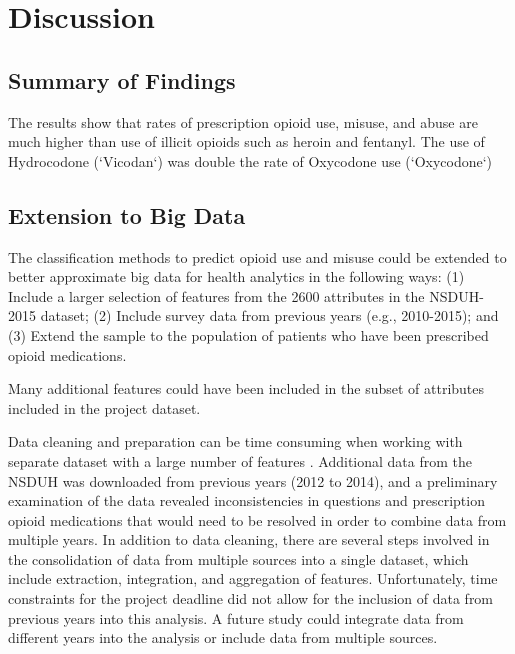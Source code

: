 \documentclass[sigconf]{acmart}
\begin{document}
\section{Discussion}

\subsection{Summary of Findings}

The results show that rates of prescription opioid use, misuse, and abuse are
much higher than use of illicit opioids such as heroin and fentanyl. The use of
Hydrocodone (`Vicodan`) was double the rate of Oxycodone use (`Oxycodone`)




\subsection{Extension to Big Data}

The classification methods to predict opioid use and misuse could be extended 
to better approximate big data for health analytics in the following ways: (1) 
Include a larger selection of features from the 2600 attributes in the NSDUH-
2015 dataset; (2) Include survey data from previous years (e.g., 2010-2015); 
and (3) Extend the sample to the population of patients who have been 
prescribed opioid medications. 

Many additional features could have been included in the subset of attributes 
included in the project dataset. 

Data cleaning and preparation can be time consuming when working
with separate dataset with a large number of features \cite{rahm00}. 
Additional data from the NSDUH was downloaded from previous years (2012 to 
2014), and a preliminary examination of the data revealed inconsistencies 
in questions and prescription opioid medications that would need to be 
resolved in order to combine data from multiple years. In addition to data 
cleaning, there are several steps involved in the consolidation of data from 
multiple sources into a single dataset, which include extraction, integration, 
and aggregation of features. Unfortunately, time constraints for the project 
deadline did not allow for the inclusion of data from previous years into this 
analysis. A future study could integrate data from different years into the
analysis or include data from multiple sources. 
\end{document}
